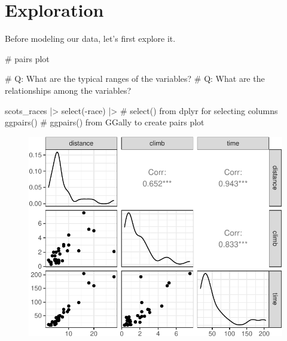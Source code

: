 \documentclass[
  11pt,
  letterpaper,
  oneside]{book}
\newenvironment{Shaded}{\begin{snugshade}}{\end{snugshade}}
\newcommand{\CommentTok}[1]{\textcolor[rgb]{0.37,0.37,0.37}{#1}}
\newcommand{\FunctionTok}[1]{\textcolor[rgb]{0.28,0.35,0.67}{#1}}
\newcommand{\NormalTok}[1]{\textcolor[rgb]{0.00,0.23,0.31}{#1}}
\newcommand{\SpecialCharTok}[1]{\textcolor[rgb]{0.37,0.37,0.37}{#1}}
\theoremstyle{plain}
\theoremstyle{plain}
\theoremstyle{definition}
\theoremstyle{definition}
\theoremstyle{plain}
\theoremstyle{remark}
\begin{document}
\hypertarget{exploration}{%
\section{Exploration}\label{exploration}}

Before modeling our data, let's first explore it.

\begin{Shaded}
\begin{Highlighting}[]
\CommentTok{\# pairs plot}

\CommentTok{\# Q: What are the typical ranges of the variables?}
\CommentTok{\# Q: What are the relationships among the variables?}

\NormalTok{scots\_races }\SpecialCharTok{|\textgreater{}}
  \FunctionTok{select}\NormalTok{(}\SpecialCharTok{{-}}\NormalTok{race) }\SpecialCharTok{|\textgreater{}} \CommentTok{\# select() from dplyr for selecting columns}
  \FunctionTok{ggpairs}\NormalTok{() }\CommentTok{\# ggpairs() from GGally to create pairs plot}
\end{Highlighting}
\end{Shaded}

\begin{figure}[H]

{\centering \includegraphics{r-demo-part-1_files/figure-pdf/unnamed-chunk-4-1.pdf}

}

\end{figure}
\end{document}
